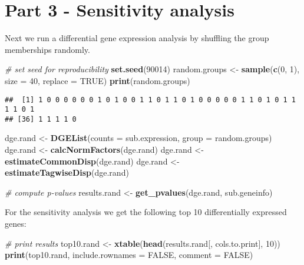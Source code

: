 \documentclass[]{article}
\newenvironment{Shaded}{\begin{snugshade}}{\end{snugshade}}
\newcommand{\KeywordTok}[1]{\textcolor[rgb]{0.13,0.29,0.53}{\textbf{{#1}}}}
\newcommand{\DataTypeTok}[1]{\textcolor[rgb]{0.13,0.29,0.53}{{#1}}}
\newcommand{\DecValTok}[1]{\textcolor[rgb]{0.00,0.00,0.81}{{#1}}}
\newcommand{\StringTok}[1]{\textcolor[rgb]{0.31,0.60,0.02}{{#1}}}
\newcommand{\CommentTok}[1]{\textcolor[rgb]{0.56,0.35,0.01}{\textit{{#1}}}}
\newcommand{\OtherTok}[1]{\textcolor[rgb]{0.56,0.35,0.01}{{#1}}}
\newcommand{\NormalTok}[1]{{#1}}
\begin{document}
\section{Part 3 - Sensitivity
analysis}\label{part-3---sensitivity-analysis}

Next we run a differential gene expression analysis by shuffling the
group memberships randomly.

\begin{Shaded}
\begin{Highlighting}[]
\CommentTok{# set seed for reproducibility}
\KeywordTok{set.seed}\NormalTok{(}\DecValTok{90014}\NormalTok{)}
\NormalTok{random.groups <-}\StringTok{ }\KeywordTok{sample}\NormalTok{(}\KeywordTok{c}\NormalTok{(}\DecValTok{0}\NormalTok{, }\DecValTok{1}\NormalTok{), }\DataTypeTok{size =} \DecValTok{40}\NormalTok{, }\DataTypeTok{replace =} \OtherTok{TRUE}\NormalTok{)}
\KeywordTok{print}\NormalTok{(random.groups)}
\end{Highlighting}
\end{Shaded}

\begin{verbatim}
##  [1] 1 0 0 0 0 0 0 1 0 1 0 0 1 1 0 1 1 0 1 0 0 0 0 0 1 1 0 1 0 1 1 1 1 0 1
## [36] 1 1 1 1 0
\end{verbatim}

\begin{Shaded}
\begin{Highlighting}[]
\NormalTok{dge.rand <-}\StringTok{ }\KeywordTok{DGEList}\NormalTok{(}\DataTypeTok{counts =} \NormalTok{sub.expression, }\DataTypeTok{group =} \NormalTok{random.groups)}
\NormalTok{dge.rand <-}\StringTok{ }\KeywordTok{calcNormFactors}\NormalTok{(dge.rand)}
\NormalTok{dge.rand <-}\StringTok{ }\KeywordTok{estimateCommonDisp}\NormalTok{(dge.rand)}
\NormalTok{dge.rand <-}\StringTok{ }\KeywordTok{estimateTagwiseDisp}\NormalTok{(dge.rand)}

\CommentTok{# compute p-values}
\NormalTok{results.rand <-}\StringTok{ }\KeywordTok{get_pvalues}\NormalTok{(dge.rand, sub.geneinfo)}
\end{Highlighting}
\end{Shaded}

For the sensitivity analysis we get the following top 10 differentially
expressed genes:

\begin{Shaded}
\begin{Highlighting}[]
\CommentTok{# print results}
\NormalTok{top10.rand <-}\StringTok{ }\KeywordTok{xtable}\NormalTok{(}\KeywordTok{head}\NormalTok{(results.rand[, cols.to.print], }\DecValTok{10}\NormalTok{))}
\KeywordTok{print}\NormalTok{(top10.rand, }\DataTypeTok{include.rownames =} \OtherTok{FALSE}\NormalTok{, }\DataTypeTok{comment =} \OtherTok{FALSE}\NormalTok{)}
\end{Highlighting}
\end{Shaded}
\end{document}

